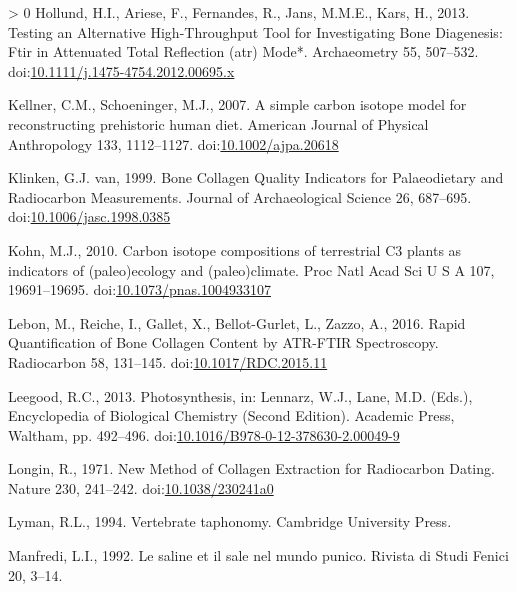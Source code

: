 \documentclass[3p]{elsarticle} %
\newlength{\cslhangindent}
\newenvironment{CSLReferences}[3] %
 {%
  \setlength{\parindent}{0pt}
  \ifodd #1 \everypar{\setlength{\hangindent}{\cslhangindent}}\ignorespaces\fi
  \ifnum #2 > 0
  \setlength{\parskip}{#2\baselineskip}
  \fi
 }%
 {}
\begin{document}
\begin{CSLReferences}{1}{0}
\leavevmode\hypertarget{ref-hollund_etal13}{}%
Hollund, H.I., Ariese, F., Fernandes, R., Jans, M.M.E., Kars, H., 2013. Testing an {Alternative High}-{Throughput Tool} for {Investigating Bone Diagenesis}: {Ftir} in {Attenuated Total Reflection} (atr) {Mode}*. Archaeometry 55, 507--532. doi:\href{https://doi.org/10.1111/j.1475-4754.2012.00695.x}{10.1111/j.1475-4754.2012.00695.x}

\leavevmode\hypertarget{ref-kellner_schoeninger07}{}%
Kellner, C.M., Schoeninger, M.J., 2007. A simple carbon isotope model for reconstructing prehistoric human diet. American Journal of Physical Anthropology 133, 1112--1127. doi:\href{https://doi.org/10.1002/ajpa.20618}{10.1002/ajpa.20618}

\leavevmode\hypertarget{ref-vanklinken99}{}%
Klinken, G.J. van, 1999. Bone {Collagen Quality Indicators} for {Palaeodietary} and {Radiocarbon Measurements}. Journal of Archaeological Science 26, 687--695. doi:\href{https://doi.org/10.1006/jasc.1998.0385}{10.1006/jasc.1998.0385}

\leavevmode\hypertarget{ref-kohn10}{}%
Kohn, M.J., 2010. Carbon isotope compositions of terrestrial {C3} plants as indicators of (paleo)ecology and (paleo)climate. Proc Natl Acad Sci U S A 107, 19691--19695. doi:\href{https://doi.org/10.1073/pnas.1004933107}{10.1073/pnas.1004933107}

\leavevmode\hypertarget{ref-lebon_etal16}{}%
Lebon, M., Reiche, I., Gallet, X., Bellot-Gurlet, L., Zazzo, A., 2016. Rapid {Quantification} of {Bone Collagen Content} by {ATR}-{FTIR Spectroscopy}. Radiocarbon 58, 131--145. doi:\href{https://doi.org/10.1017/RDC.2015.11}{10.1017/RDC.2015.11}

\leavevmode\hypertarget{ref-leegood13}{}%
Leegood, R.C., 2013. Photosynthesis, in: Lennarz, W.J., Lane, M.D. (Eds.), Encyclopedia of {Biological Chemistry} ({Second Edition}). {Academic Press}, {Waltham}, pp. 492--496. doi:\href{https://doi.org/10.1016/B978-0-12-378630-2.00049-9}{10.1016/B978-0-12-378630-2.00049-9}

\leavevmode\hypertarget{ref-longin71}{}%
Longin, R., 1971. New {Method} of {Collagen Extraction} for {Radiocarbon Dating}. Nature 230, 241--242. doi:\href{https://doi.org/10.1038/230241a0}{10.1038/230241a0}

\leavevmode\hypertarget{ref-lyman94}{}%
Lyman, R.L., 1994. Vertebrate taphonomy. {Cambridge University Press}.

\leavevmode\hypertarget{ref-manfredi92}{}%
Manfredi, L.I., 1992. Le saline et il sale nel mundo punico. Rivista di Studi Fenici 20, 3--14.


\end{CSLReferences}
\end{document}
